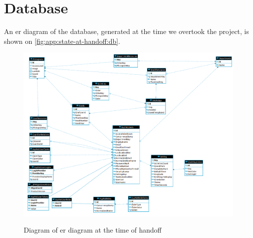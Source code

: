 \section{Database}\label{app:state-at-handoff:db}

An \gls{er} diagram of the database, generated at the time we overtook the project, is shown on \autoref{fig:app:state-at-handoff:db}.

\begin{figure}[ht]
    \centering
    \caption{Diagram of \gls{er} diagram at the time of handoff}
    \includegraphics[width=1\textwidth]{figures/db_ho.png}
    \label{fig:app:state-at-handoff:db}
\end{figure}
